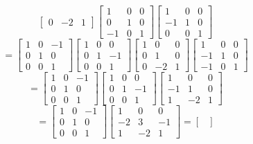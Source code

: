 \documentclass[12pt]{article}
\begin{document}
\begin{itemize}
\begin{itemize}
$$\begin{bmatrix}
0 & -2 & 1
\end{bmatrix}\begin{bmatrix}
1 & 0 & 0 \\
0 & 1 & 0 \\
-1 & 0 & 1
\end{bmatrix}\begin{bmatrix}
1 & 0 & 0 \\
-1 & 1 & 0 \\
0 & 0 & 1
\end{bmatrix}$$
$$= \begin{bmatrix}
1 & 0 & -1 \\
0 & 1 & 0 \\
0 & 0 & 1
\end{bmatrix}\begin{bmatrix}
1 & 0 & 0 \\
0 & 1 & -1 \\
0 & 0 & 1
\end{bmatrix}\begin{bmatrix}
1 & 0 & 0 \\
0 & 1 & 0 \\
0 & -2 & 1
\end{bmatrix}\begin{bmatrix}
1 & 0 & 0 \\
-1 & 1 & 0 \\
-1 & 0 & 1
\end{bmatrix}$$
$$= \begin{bmatrix}
1 & 0 & -1 \\
0 & 1 & 0 \\
0 & 0 & 1
\end{bmatrix}\begin{bmatrix}
1 & 0 & 0 \\
0 & 1 & -1 \\
0 & 0 & 1
\end{bmatrix}\begin{bmatrix}
1 & 0 & 0 \\
-1 & 1 & 0 \\
1 & -2 & 1
\end{bmatrix}$$
$$= \begin{bmatrix}
1 & 0 & -1 \\
0 & 1 & 0 \\
0 & 0 & 1
\end{bmatrix}\begin{bmatrix}
1 & 0 & 0 \\
-2 & 3 & -1 \\
1 & -2 & 1
\end{bmatrix} = \begin{bmatrix}

\end{bmatrix}$$
\end{itemize}
\end{itemize}
\end{document}
